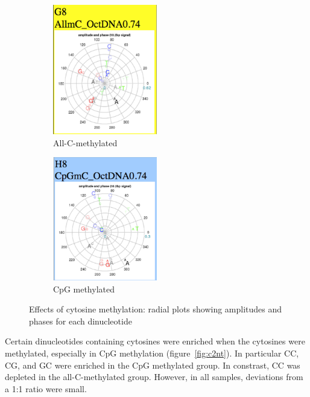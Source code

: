 \documentclass[parskip=full, numbers=noenddot]{scrreprt}
\begin{document}
\begin{figure}[htpb]
  \begin{subfigure}[htpb]{0.5\textwidth}
    \centering
    \includegraphics[width=0.5\textwidth]{emsa_g8_radial}
    \caption{All-C-methylated}
    \label{fig:radial_mc_allmc}
  \end{subfigure}
  \begin{subfigure}[htpb]{0.5\textwidth}
    \centering
    \includegraphics[width=0.5\textwidth]{emsa_h8_radial}
    \caption{CpG methylated}
    \label{fig:radial_mc_cpg}
  \end{subfigure}
  \caption{Effects of cytosine methylation: radial plots showing amplitudes and phases for each dinucleotide}
  \label{fig:radial_mc}
\end{figure}

Certain dinucleotides containing cytosines were enriched when the cytosines were methylated, especially in CpG methylation (figure~\ref{fig:c2nt}).  In particular CC, CG, and GC were enriched in the CpG methylated group.  In constrast, CC was depleted in the all-C-methylated group.  However, in all samples, deviations from a 1:1 ratio were small.
\end{document}

